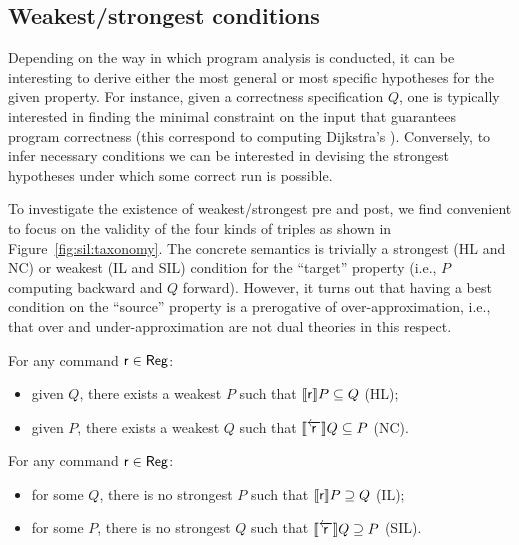\subsection{Weakest/strongest conditions}\label{sec:sil:extremal-conditions}
Depending on the way in which program analysis is conducted, it can be interesting to derive either the most general or most specific hypotheses for the given property.
For instance, given a correctness specification $Q$, one is typically interested in finding the minimal constraint on the input that guarantees program correctness (this correspond to computing Dijkstra's \wlp{}).
Conversely, to infer necessary conditions we can be interested in devising the strongest hypotheses under which some correct run is possible.

To investigate the existence of weakest/strongest pre and post, we find convenient to focus on the validity of the four kinds of triples as shown in Figure~\ref{fig:sil:taxonomy}.
The concrete semantics is trivially a strongest (HL and NC) or weakest (IL and SIL) condition for the ``target'' property (i.e., $P$ computing backward and $Q$ forward).
However, it turns out that having a best condition on the ``source'' property is a prerogative of over-approximation, i.e., that over and under-approximation are not dual theories in this respect.
\begin{prop}\label{prop:sil:weakest-cond-existence}
	For any command $\mathsf{r}\in\mathsf{Reg}$:
	\begin{itemize}
		\item given $Q$, there exists a weakest $P$ such that $\llbracket\mathsf{r}\rrbracket P \subseteq Q$ (HL);
		\item given $P$, there exists a weakest $Q$ such that $\llbracket\overleftarrow{\mathsf{r}}\rrbracket Q \subseteq P$ (NC).
	\end{itemize}
\end{prop}

\begin{prop}\label{prop:sil:strongest-cond-non-existence}
	For any command $\mathsf{r}\in\mathsf{Reg}$:
	\begin{itemize}
		\item for some $Q$, there is no strongest $P$ such that $\llbracket\mathsf{r}\rrbracket P \supseteq Q$ (IL);
		\item for some $P$, there is no strongest $Q$ such that $\llbracket\overleftarrow{\mathsf{r}}\rrbracket Q \supseteq P$ (SIL).
	\end{itemize}
\end{prop}

